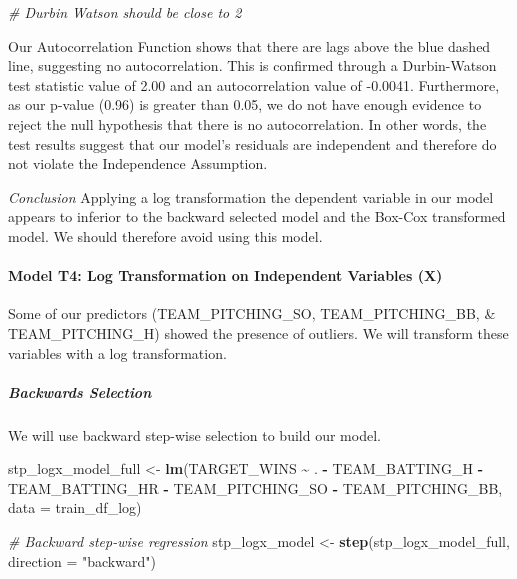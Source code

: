 \documentclass[
]{article}
\newenvironment{Shaded}{\begin{snugshade}}{\end{snugshade}}
\newcommand{\AttributeTok}[1]{\textcolor[rgb]{0.13,0.29,0.53}{#1}}
\newcommand{\CommentTok}[1]{\textcolor[rgb]{0.56,0.35,0.01}{\textit{#1}}}
\newcommand{\FunctionTok}[1]{\textcolor[rgb]{0.13,0.29,0.53}{\textbf{#1}}}
\newcommand{\NormalTok}[1]{#1}
\newcommand{\OtherTok}[1]{\textcolor[rgb]{0.56,0.35,0.01}{#1}}
\newcommand{\SpecialCharTok}[1]{\textcolor[rgb]{0.81,0.36,0.00}{\textbf{#1}}}
\newcommand{\StringTok}[1]{\textcolor[rgb]{0.31,0.60,0.02}{#1}}
\begin{document}
\begin{Shaded}
\begin{Highlighting}[]
\CommentTok{\# Durbin Watson should be close to 2}
\end{Highlighting}
\end{Shaded}

Our Autocorrelation Function shows that there are lags above the blue
dashed line, suggesting no autocorrelation. This is confirmed through a
Durbin-Watson test statistic value of 2.00 and an autocorrelation value
of -0.0041. Furthermore, as our p-value (0.96) is greater than 0.05, we
do not have enough evidence to reject the null hypothesis that there is
no autocorrelation. In other words, the test results suggest that our
model's residuals are independent and therefore do not violate the
Independence Assumption.

\emph{Conclusion} Applying a log transformation the dependent variable
in our model appears to inferior to the backward selected model and the
Box-Cox transformed model. We should therefore avoid using this model.

\paragraph{Model T4: Log Transformation on Independent Variables
(X)}\label{model-t4-log-transformation-on-independent-variables-x}

Some of our predictors (TEAM\_PITCHING\_SO, TEAM\_PITCHING\_BB, \&
TEAM\_PITCHING\_H) showed the presence of outliers. We will transform
these variables with a log transformation.

\subparagraph{Backwards Selection}\label{backwards-selection}

We will use backward step-wise selection to build our model.

\begin{Shaded}
\begin{Highlighting}[]
\NormalTok{stp\_logx\_model\_full }\OtherTok{\textless{}{-}} \FunctionTok{lm}\NormalTok{(TARGET\_WINS }\SpecialCharTok{\textasciitilde{}}\NormalTok{ . }\SpecialCharTok{{-}}\NormalTok{ TEAM\_BATTING\_H }\SpecialCharTok{{-}}\NormalTok{ TEAM\_BATTING\_HR }\SpecialCharTok{{-}}\NormalTok{ TEAM\_PITCHING\_SO }\SpecialCharTok{{-}}\NormalTok{ TEAM\_PITCHING\_BB, }\AttributeTok{data =}\NormalTok{ train\_df\_log)}

\CommentTok{\# Backward step{-}wise regression}
\NormalTok{stp\_logx\_model }\OtherTok{\textless{}{-}} \FunctionTok{step}\NormalTok{(stp\_logx\_model\_full, }\AttributeTok{direction =} \StringTok{"backward"}\NormalTok{)}
\end{Highlighting}
\end{Shaded}
\end{document}
